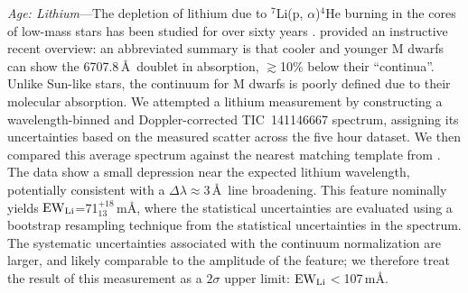 \documentclass{nature3}
\begin{document}
\begin{methods}

{\it Age: Lithium}---The depletion of lithium due to $^7$Li(p,
$\alpha$)$^4$He burning in the cores of low-mass stars has been
studied for over sixty years
\cite{Hayashi1963,Bildsten1997,Burke2004}.  \cite{Wood2023} provided
an instructive recent overview: an abbreviated summary is that cooler
and younger M dwarfs can show the 6707.8\,\AA\ doublet in absorption,
$\gtrsim$10\% below their ``continua''.  Unlike Sun-like stars, the
continuum for M dwarfs is poorly defined due to their molecular
absorption.  We attempted a lithium measurement by constructing a
wavelength-binned and Doppler-corrected TIC~141146667 spectrum,
assigning its uncertainties based on the measured scatter across the
five hour dataset.  We then compared this average spectrum against the
nearest matching template from \cite{Bochanski2007}.  The data show a
small depression near the expected lithium wavelength, potentially
consistent with a $\Delta \lambda$$\approx$3\,\AA\ line broadening.
This feature nominally yields ${\rm EW}_{\rm
Li}$=71$^{+18}_{13}$\,m\AA, where the statistical uncertainties are
evaluated using a bootstrap resampling technique from the statistical
uncertainties in the spectrum.  The systematic uncertainties
associated with the continuum normalization are larger, and likely
comparable to the amplitude of the feature; we therefore treat the
result of this measurement as a $2\sigma$ upper limit: ${\rm EW}_{\rm
Li}$$<$107\,m\AA.


\end{methods}
\end{document}
